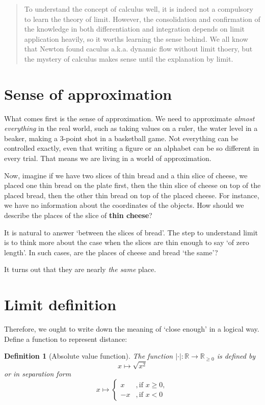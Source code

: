 \documentclass[12pt]{article}
\newtheorem{definition}{Definition}[section]
\begin{document}
    \begin{abstract}
        To understand the concept of calculus well, it is indeed not a compulsory to learn the theory of limit. However, the consolidation and confirmation of the knowledge in both differentiation and integration depends on limit application heavily, so it worths learning the sense behind. We all know that Newton found caculus a.k.a. dynamic flow without limit thoery, but the mystery of calculus makes sense until the explanation by limit.
    \end{abstract}

    \section{Sense of approximation}

    What comes first is the sense of approximation. We need to approximate \textit{almost everything} in the real world, such as taking values on a ruler, the water level in a beaker, making a 3-point shot in a basketball game. Not everything can be controlled exactly, even that writing a figure or an alphabet can be so different in every trial. That means we are living in a world of approximation.

    Now, imagine if we have two slices of thin bread and a thin slice of cheese, we placed one thin bread on the plate first, then the thin slice of cheese on top of the placed bread, then the other thin bread on top of the placed cheese. For instance, we have no information about the coordinates of the objects. How should we describe the places of the slice of \textbf{thin cheese}?

    It is natural to answer `between the slices of bread'. The step to understand limit is to think more about the case when the slices are thin enough to say `of zero length'. In such cases, are the places of cheese and bread `the same'?

    It turns out that they are nearly \textit{the same} place.

    \section{Limit definition}

    Therefore, we ought to write down the meaning of `close enough' in a logical way. Define a function to represent distance:

    \begin{definition}[Absolute value function]
        The function $|\cdot|:\mathbb{R}\to\mathbb{R}_{\geq 0}$ is defined by \[x\mapsto \sqrt{x^2}\] or in separation form \[x\mapsto \begin{cases}
            x&,\textrm{if }x\geq 0,\\
            -x&,\textrm{if }x< 0
        \end{cases}\]
    \end{definition}
\end{document}
